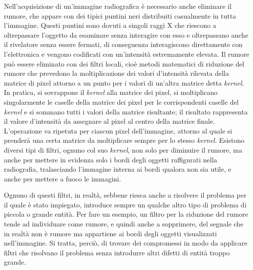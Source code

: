 Nell'acquisizione di un'immagine radiografica è necessario anche eliminare il rumore, che appare con dei tipici puntini neri distribuiti casualmente in tutta l'immagine. Questi puntini sono dovuti a singoli raggi X che riescono a oltrepassare l'oggetto da esaminare senza interagire con esso e oltrepassano anche il rivelatore senza essere fermati, di conseguenza interagiscono direttamente con l'elettronica e vengono codificati con un'intensità estremamente elevata. Il rumore può essere eliminato con dei filtri locali, cioè metodi matematici di riduzione del rumore che prevedono la moltiplicazione dei valori d'intensità rilevata della matrice di pixel attorno a un punto per i valori di un'altra matrice detta \textit{kernel}. In pratica, si sovrappone il \textit{kernel} alla matrice dei pixel, si moltiplicano singolarmente le caselle della matrice dei pixel per le corrispondenti caselle del \textit{kernel} e si sommano tutti i valori della matrice risultante; il risultato rappresenta il valore d'intensità da assegnare al pixel al centro della matrice finale. L'operazione va ripetuta per ciascun pixel dell'immagine, attorno al quale si prenderà una certa matrice da moltiplicare sempre per lo stesso \textit{kernel}. Esistono diversi tipi di filtri, ognuno col suo \textit{kernel}, non solo per diminuire il rumore, ma anche per mettere in evidenza solo i bordi degli oggetti raffigurati nella radiografia, tralasciando l'immagine interna ai bordi qualora non sia utile, e anche per mettere a fuoco le immagini.

Ognuno di questi filtri, in realtà, sebbene riesca anche a risolvere il problema per il quale è stato impiegato, introduce sempre un qualche altro tipo di problema di piccola o grande entità. Per fare un esempio, un filtro per la riduzione del rumore tende ad individuare come rumore, e quindi anche a sopprimere, del segnale che in realtà non è rumore ma appartiene ai bordi degli oggetti visualizzati nell'immagine. Si tratta, perciò, di trovare dei compromessi in modo da applicare filtri che risolvano il problema senza introdurre altri difetti di entità troppo grande.

